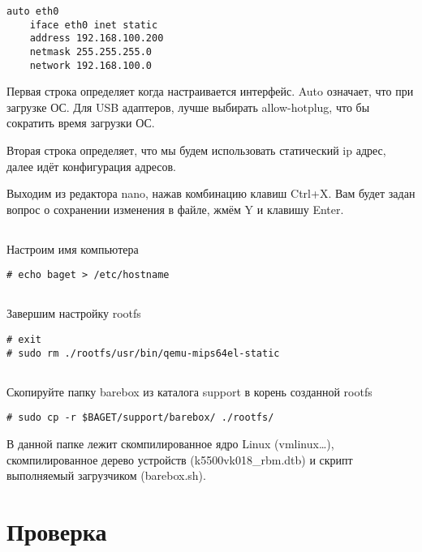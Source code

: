 \begin{lstlisting}[style=stdout]
auto eth0
	iface eth0 inet static
	address 192.168.100.200
	netmask 255.255.255.0
	network 192.168.100.0
\end{lstlisting}

Первая строка определяет когда настраивается интерфейс. Auto означает, что при загрузке ОС. 
Для USB адаптеров, лучше выбирать allow-hotplug, что бы сократить время загрузки ОС. 

Вторая строка определяет, что мы будем использовать статический ip адрес, 
далее идёт конфигурация адресов.

Выходим из редактора nano, нажав комбинацию клавиш Ctrl+X. Вам будет задан вопрос о сохранении изменения в файле, жмём Y и клавишу Enter.

\subsection{}Настроим имя компьютера

\begin{lstlisting}[style=bash]
# echo baget > /etc/hostname
\end{lstlisting}

\subsection{}Завершим настройку rootfs

\begin{lstlisting}[style=bash]
# exit
# sudo rm ./rootfs/usr/bin/qemu-mips64el-static
\end{lstlisting}

\subsection{}Скопируйте папку barebox из каталога support в корень созданной rootfs
\begin{lstlisting}[style=bash]
# sudo cp -r $BAGET/support/barebox/ ./rootfs/
\end{lstlisting}

В данной папке лежит скомпилированное ядро Linux (vmlinux…), скомпилированное дерево устройств (k5500vk018\_rbm.dtb) и скрипт выполняемый загрузчиком (barebox.sh).



\section{Проверка}

